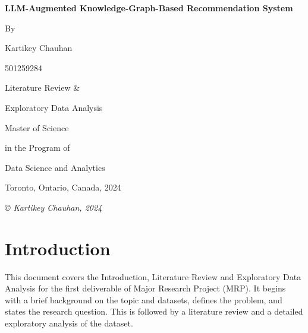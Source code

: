 \documentclass{article}
\begin{document}
\begin{titlepage}
\centering
{\LARGE\bfseries LLM-Augmented Knowledge-Graph-Based Recommendation System}

\vspace{1.5cm}

{\Large By}

{\Large Kartikey Chauhan

501259284 }

\vspace{2cm}
{\Large Literature Review \& 


Exploratory Data Analysis 
}

\vspace{2cm}

{\Large Master of Science

in the Program of 

Data Science and Analytics

}

\vspace{2cm}
{\Large Toronto, Ontario, Canada, 2024}

\vfill

{\itshape © Kartikey Chauhan, 2024}
\end{titlepage}

\setcounter{page}{2}

\tableofcontents
\listoffigures
\listoftables


\fancyhf{}
\renewcommand{\headrulewidth}{0pt}
\fancyfoot[R]{\thepage}
\renewcommand{\footrulewidth}{0pt}

\section{Introduction}

This document covers the Introduction, Literature Review and Exploratory Data Analysis for the first deliverable of Major Research Project (MRP). It begins with a brief background on the topic and datasets, defines the problem, and states the research question. This is followed by a literature review and a detailed exploratory analysis of the dataset.
\end{document}
